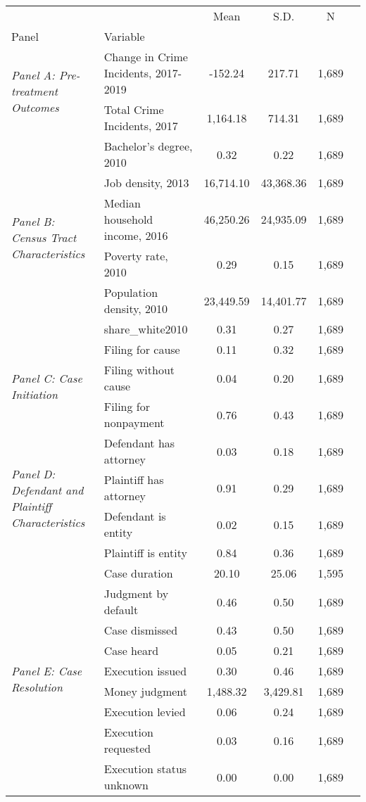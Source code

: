 \begin{tabular}{llcccc}
\toprule
 &  & Mean & S.D. & N \\
Panel & Variable &  &  &  \\
\midrule
\multirow[c]{2}{4cm}{\textit{Panel A: Pre-treatment Outcomes}} & Change in Crime Incidents, 2017-2019 & -152.24 & 217.71 & 1,689 \\
 & Total Crime Incidents, 2017 & 1,164.18 & 714.31 & 1,689 \\
\cline{1-5}
\multirow[c]{6}{4cm}{\textit{Panel B: Census Tract Characteristics}} & Bachelor's degree, 2010 & 0.32 & 0.22 & 1,689 \\
 & Job density, 2013 & 16,714.10 & 43,368.36 & 1,689 \\
 & Median household income, 2016 & 46,250.26 & 24,935.09 & 1,689 \\
 & Poverty rate, 2010 & 0.29 & 0.15 & 1,689 \\
 & Population density, 2010 & 23,449.59 & 14,401.77 & 1,689 \\
 & share_white2010 & 0.31 & 0.27 & 1,689 \\
\cline{1-5}
\multirow[c]{3}{4cm}{\textit{Panel C: Case Initiation}} & Filing for cause & 0.11 & 0.32 & 1,689 \\
 & Filing without cause & 0.04 & 0.20 & 1,689 \\
 & Filing for nonpayment & 0.76 & 0.43 & 1,689 \\
\cline{1-5}
\multirow[c]{4}{4cm}{\textit{Panel D: Defendant and Plaintiff Characteristics}} & Defendant has attorney & 0.03 & 0.18 & 1,689 \\
 & Plaintiff has attorney & 0.91 & 0.29 & 1,689 \\
 & Defendant is entity & 0.02 & 0.15 & 1,689 \\
 & Plaintiff is entity & 0.84 & 0.36 & 1,689 \\
\cline{1-5}
\multirow[c]{9}{4cm}{\textit{Panel E: Case Resolution}} & Case duration & 20.10 & 25.06 & 1,595 \\
 & Judgment by default & 0.46 & 0.50 & 1,689 \\
 & Case dismissed & 0.43 & 0.50 & 1,689 \\
 & Case heard & 0.05 & 0.21 & 1,689 \\
 & Execution issued & 0.30 & 0.46 & 1,689 \\
 & Money judgment & 1,488.32 & 3,429.81 & 1,689 \\
 & Execution levied & 0.06 & 0.24 & 1,689 \\
 & Execution requested & 0.03 & 0.16 & 1,689 \\
 & Execution status unknown & 0.00 & 0.00 & 1,689 \\
\cline{1-5}
\bottomrule
\end{tabular}
